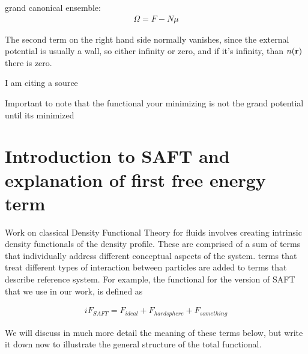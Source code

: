 grand canonical ensemble:
\begin{align}
  \Omega = F - N \mu
\end{align}

The second term on the right hand side normally vanishes, since the
external potential is usually a wall, so either infinity or zero, and
if it's infinity, than $n(\textbf{r})$ there is zero.







I am citing a source~\cite{huang2003dynamic}
\clearpage
\newpage

Important to note that the functional your minimizing is not the grand
potential until its minimized



\section{Introduction to SAFT and explanation of first free energy term}


Work on classical Density Functional Theory for fluids involves
creating intrinsic density functionals of the density profile.  These
are comprised of a sum of terms that individually address different
conceptual aspects of the system.   terms that treat different types
of interaction between particles are added to terms that describe
reference system.  For example, the functional for the version of SAFT
that we use in our work, is defined as

\begin{align}
  iF_{SAFT} = F_{ideal} + F_{hard sphere} + F_{something}
\end{align}

We will discuss in much more detail the meaning of these terms below,
but write it down now to illustrate the general structure of the total
functional.


